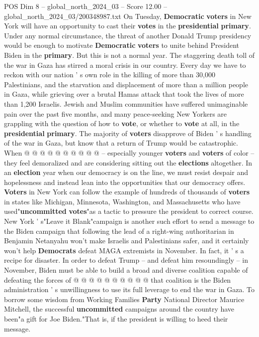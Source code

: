 \begin{textsample}{POS Dim 8 – global\_north\_2024\_03 – Score 12.00 – global\_north\_2024\_03/200348987.txt}  \label{ex:f8_pos_011}
On Tuesday, \textbf{Democratic} \textbf{voters} in New York will have an opportunity to cast their \textbf{votes} in the \textbf{presidential} \textbf{primary}.
Under any normal circumstance, the threat of another Donald Trump presidency would be enough to motivate \textbf{Democratic} \textbf{voters} to unite behind President Biden in the \textbf{primary}.
But this is not a normal year.
The staggering death toll of the war in Gaza has stirred a moral crisis in our country.
Every day we have to reckon with our nation ' s own role in the killing of more than 30,000 Palestinians, and the starvation and displacement of more than a million people in Gaza, while grieving over a brutal Hamas attack that took the lives of more than 1,200 Israelis.
Jewish and Muslim communities have suffered unimaginable pain over the past five months, and many peace-seeking New Yorkers are grappling with the question of how to \textbf{vote}, or whether to \textbf{vote} at all, in the \textbf{presidential} \textbf{primary}.
The majority of \textbf{voters} disapprove of Biden ' s handling of the war in Gaza, but know that a return of Trump would be catastrophic.
When @ @ @ @ @ @ @ @ @ @ -- especially younger \textbf{voters} and \textbf{voters} of color -- they feel demoralized and are considering sitting out the \textbf{elections} altogether.
In an \textbf{election} year when our democracy is on the line, we must resist despair and hopelessness and instead lean into the opportunities that our democracy offers. \textbf{Voters} in New York can follow the example of hundreds of thousands of \textbf{voters} in states like Michigan, Minnesota, Washington, and Massachusetts who have used"\textbf{uncommitted} \textbf{votes}"as a tactic to pressure the president to correct course.
New York ' s"Leave it Blank"campaign is another such effort to send a message to the Biden campaign that following the lead of a right-wing authoritarian in Benjamin Netanyahu won't make Israelis and Palestinians safer, and it certainly won't help \textbf{Democrats} defeat MAGA extremists in November.
In fact, it ' s a recipe for disaster.
In order to defeat Trump -- and defeat him resoundingly -- in November, Biden must be able to build a broad and diverse coalition capable of defeating the forces of @ @ @ @ @ @ @ @ @ @ that coalition is the Biden administration ' s unwillingness to use its full leverage to end the war in Gaza.
To borrow some wisdom from Working Families \textbf{Party} National Director Maurice Mitchell, the successful \textbf{uncommitted} campaigns around the country have been"a gift for Joe Biden."That is, if the president is willing to heed their message.

\end{textsample}
